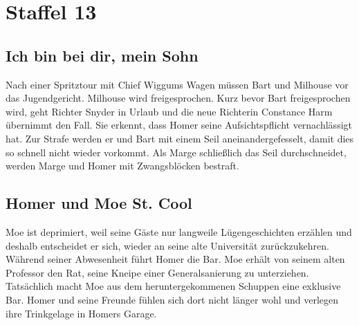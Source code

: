 
\section{Staffel 13}
 	
\subsection{Ich bin bei dir, mein Sohn}\label{CABF22}
Nach einer Spritztour mit Chief Wiggums Wagen müssen Bart und Milhouse vor das Jugendgericht. Milhouse wird freigesprochen. Kurz bevor Bart freigesprochen wird, geht Richter Snyder in Urlaub und die neue Richterin Constance Harm übernimmt den Fall. Sie erkennt, dass Homer seine Aufsichtspflicht vernachlässigt hat. Zur Strafe werden er und Bart mit einem Seil aneinandergefesselt, damit dies so schnell nicht wieder vorkommt. Als Marge schließlich das Seil durchschneidet, werden Marge und Homer mit Zwangsblöcken bestraft.


\subsection{Homer und Moe St. Cool}
Moe ist deprimiert, weil seine Gäste nur langweile Lügengeschichten erzählen und deshalb entscheidet er sich, wieder an seine alte Universität zurückzukehren. Während seiner Abwesenheit führt Homer die Bar. Moe erhält von seinem alten Professor den Rat, seine Kneipe einer Generalsanierung zu unterziehen. Tatsächlich macht Moe aus dem heruntergekommenen Schuppen eine exklusive Bar. Homer und seine Freunde fühlen sich dort nicht länger wohl und verlegen ihre Trinkgelage in Homers Garage.

